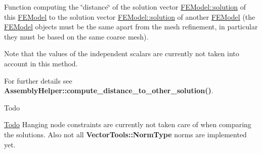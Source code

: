 Function computing the \char`\"{}distance\char`\"{} of the solution vector \hyperlink{classincremental_f_e_1_1_f_e_model_a02134975db38fcf4f7ce698d605baa30}{F\+E\+Model\+::solution} of this \hyperlink{classincremental_f_e_1_1_f_e_model}{F\+E\+Model} to the solution vector \hyperlink{classincremental_f_e_1_1_f_e_model_a02134975db38fcf4f7ce698d605baa30}{F\+E\+Model\+::solution} of another \hyperlink{classincremental_f_e_1_1_f_e_model}{F\+E\+Model} (the \hyperlink{classincremental_f_e_1_1_f_e_model}{F\+E\+Model} objects must be the same apart from the mesh refinement, in particular they must be based on the same coarse mesh).

Note that the values of the independent scalars are currently not taken into account in this method.

For further details see {\bf Assembly\+Helper\+::compute\+\_\+distance\+\_\+to\+\_\+other\+\_\+solution()}.

\begin{DoxyRefDesc}{Todo}
\item[\hyperlink{todo__todo000001}{Todo}]Hanging node constraints are currently not taken care of when comparing the solutions. Also not all {\bf Vector\+Tools\+::\+Norm\+Type} norms are implemented yet.\end{DoxyRefDesc}



